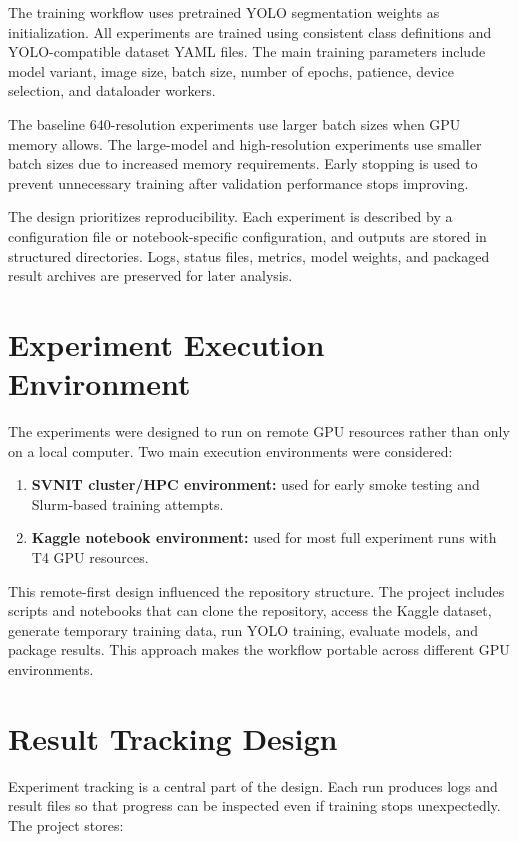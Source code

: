 The training workflow uses pretrained YOLO segmentation weights as initialization. All experiments are trained using consistent class definitions and YOLO-compatible dataset YAML files. The main training parameters include model variant, image size, batch size, number of epochs, patience, device selection, and dataloader workers.

The baseline 640-resolution experiments use larger batch sizes when GPU memory allows. The large-model and high-resolution experiments use smaller batch sizes due to increased memory requirements. Early stopping is used to prevent unnecessary training after validation performance stops improving.

The design prioritizes reproducibility. Each experiment is described by a configuration file or notebook-specific configuration, and outputs are stored in structured directories. Logs, status files, metrics, model weights, and packaged result archives are preserved for later analysis.

\section{Experiment Execution Environment}

The experiments were designed to run on remote GPU resources rather than only on a local computer. Two main execution environments were considered:

\begin{enumerate}
    \item \textbf{SVNIT cluster/HPC environment:} used for early smoke testing and Slurm-based training attempts.
    \item \textbf{Kaggle notebook environment:} used for most full experiment runs with T4 GPU resources.
\end{enumerate}

This remote-first design influenced the repository structure. The project includes scripts and notebooks that can clone the repository, access the Kaggle dataset, generate temporary training data, run YOLO training, evaluate models, and package results. This approach makes the workflow portable across different GPU environments.

\section{Result Tracking Design}

Experiment tracking is a central part of the design. Each run produces logs and result files so that progress can be inspected even if training stops unexpectedly. The project stores:

